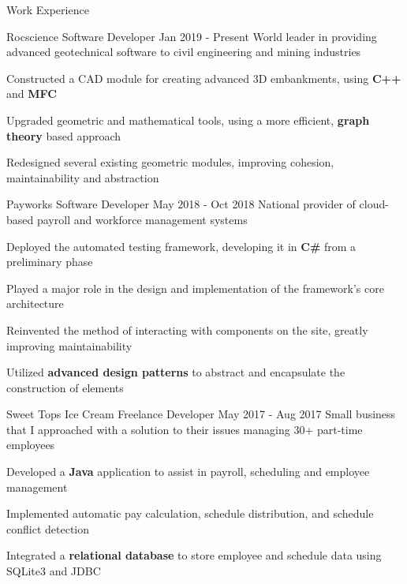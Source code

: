 \documentclass{resume} %
\begin{document}
\begin{rSection}{Work Experience}
    
    \begin{workexperience}
        {Rocscience}
        {Software Developer}
        {Jan 2019 - Present}
        {World leader in providing advanced geotechnical software to civil engineering and mining industries}
        {
            \item Constructed a CAD module for creating advanced 3D embankments, using \textbf{C++} and \textbf{MFC}
            \item Upgraded geometric and mathematical tools, using a more efficient, \textbf{graph theory} based approach
            \item Redesigned several existing geometric modules, improving cohesion, maintainability and abstraction
        }
    \end{workexperience}

    \begin{workexperience}
        {Payworks}
        {Software Developer}
        {May 2018 - Oct 2018}
        {National provider of cloud-based payroll and workforce management systems}
        {
            \item Deployed the automated testing framework, developing it in \textbf{C\#} from a preliminary phase
            \item Played a major role in the design and implementation of the framework's core architecture
            \item Reinvented the method of interacting with components on the site, greatly improving maintainability
            \item Utilized \textbf{advanced design patterns} to abstract and encapsulate the construction of elements
        }
    \end{workexperience}

    \begin{workexperience}
        {Sweet Tops Ice Cream}
        {Freelance Developer}
        {May 2017 - Aug 2017}
        {Small business that I approached with a solution to their issues managing 30+ part-time employees}
        {
            \item Developed a \textbf{Java} application to assist in payroll, scheduling and employee management
            \item Implemented automatic pay calculation, schedule distribution, and schedule conflict detection
            \item Integrated a \textbf{relational database} to store employee and schedule data using SQLite3 and JDBC
        }
    \end{workexperience}

\end{rSection}
\end{document}
